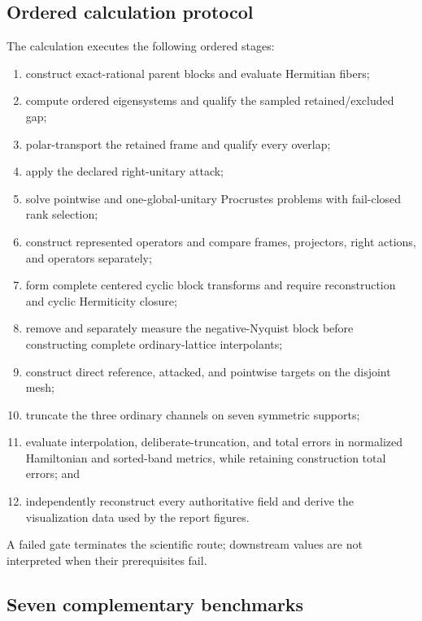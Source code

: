 \documentclass[11pt]{article}
\begin{document}
\subsection{Ordered calculation protocol}

The calculation executes the following ordered stages:
\begin{enumerate}
 \item construct exact-rational parent blocks and evaluate Hermitian fibers;
 \item compute ordered eigensystems and qualify the sampled retained/excluded gap;
 \item polar-transport the retained frame and qualify every overlap;
 \item apply the declared right-unitary attack;
 \item solve pointwise and one-global-unitary Procrustes problems with fail-closed rank
       selection;
 \item construct represented operators and compare frames, projectors, right actions,
       and operators separately;
 \item form complete centered cyclic block transforms and require reconstruction and
       cyclic Hermiticity closure;
 \item remove and separately measure the negative-Nyquist block before constructing
       complete ordinary-lattice interpolants;
 \item construct direct reference, attacked, and pointwise targets on the disjoint mesh;
 \item truncate the three ordinary channels on seven symmetric supports;
 \item evaluate interpolation, deliberate-truncation, and total errors in normalized
       Hamiltonian and sorted-band metrics, while retaining construction total errors;
       and
 \item independently reconstruct every authoritative field and derive the
       visualization data used by the report figures.
\end{enumerate}
A failed gate terminates the scientific route; downstream values are not interpreted
when their prerequisites fail.

\subsection{Seven complementary benchmarks}
\end{document}
